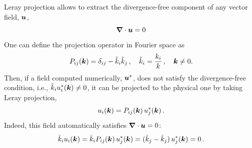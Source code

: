 \documentclass{article}
\begin{document}






Leray projection allows to extract the divergence-free component 
of any vector field, $\uu$,
\begin{equation}
    \label{eq: div zero}
    \nab \cdot \uu = 0
\end{equation}
One can define the projection operator in Fourier space as
\begin{equation}
    \label{eq: projection}
    P_{ij}(\kk) = \delta_{ij} -
    \hat k_i \hat k_j\,, \quad \hat k_i = \frac{k_i}{k}\,,
    \quad \kk \neq 0 .
\end{equation}
Then, if a field computed numerically, $\uu^\ast$, does not satisfy the
divergence-free condition, i.e., $\hat k_i u_i^\ast (\kk) \neq 0$,
it can be projected to the physical one by taking
Leray projection,
\begin{equation}
    u_i (\kk) = P_{ij} (\kk)\, u_j^\ast (\kk)\,.
\end{equation}
Indeed, this field automatically satisfies $\nab \cdot \uu = 0$:
\begin{equation}
    \hat k_i u_i (\kk) = \hat k_i P_{ij} (\kk) \, u_j^\ast (\kk) = 
    (\hat k_j - \hat k_j) \, u_j^\ast (\kk) = 0\,.
\end{equation}
\end{document}
